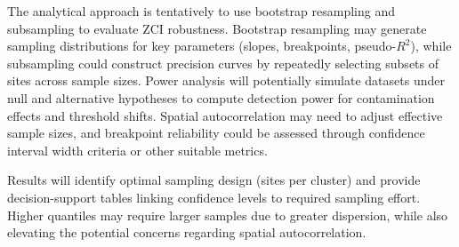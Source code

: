 The analytical approach is tentatively to use bootstrap resampling and subsampling to evaluate ZCI robustness.
Bootstrap resampling may generate sampling distributions for key parameters (slopes, breakpoints, pseudo-$R^2$),
while subsampling could construct precision curves by repeatedly selecting subsets of sites across sample sizes.
Power analysis will potentially simulate datasets under null and alternative hypotheses to compute detection power
for contamination effects and threshold shifts. Spatial autocorrelation may need to adjust effective sample sizes,
and breakpoint reliability could be assessed through confidence interval width criteria or other suitable metrics.


Results will identify optimal sampling design (sites per cluster) and provide decision-support tables
linking confidence levels to required sampling effort. Higher quantiles may require larger samples due to greater dispersion,
while also elevating the potential concerns regarding spatial autocorrelation.





